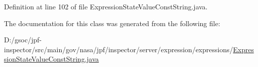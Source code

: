 Definition at line 102 of file Expression\+State\+Value\+Const\+String.\+java.



The documentation for this class was generated from the following file\+:\begin{DoxyCompactItemize}
\item 
D\+:/gsoc/jpf-\/inspector/src/main/gov/nasa/jpf/inspector/server/expression/expressions/\hyperlink{_expression_state_value_const_string_8java}{Expression\+State\+Value\+Const\+String.\+java}\end{DoxyCompactItemize}
